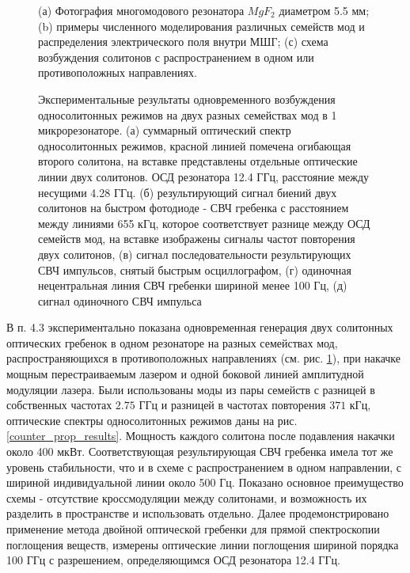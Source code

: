 \begin{figure}[!htb]
\begin{minipage}{1\linewidth}
\end{minipage}
\caption{(а) Фотография многомодового резонатора $MgF_2$ диаметром 5.5 мм; (b) примеры численного моделирования различных семейств мод и распределения электрического поля внутри МШГ; (с) схема возбуждения солитонов с распространением в одном или противоположных направлениях.}
\label{Figure1_V1_c}
\end{figure}

\begin{figure}[!htb]
\begin{minipage}{1\linewidth}
\end{minipage}
\caption{Экспериментальные результаты одновременного возбуждения односолитонных режимов на двух разных семействах мод в 1 микрорезонаторе. (а) суммарный оптический спектр односолитонных режимов, красной линией помечена огибающая второго солитона, на вставке представлены отдельные оптические линии двух солитонов. ОСД резонатора 12.4 ГГц, расстояние между несущими 4.28 ГГц. (б) результирующий сигнал биений двух солитонов на быстром фотодиоде - СВЧ гребенка с расстоянием между линиями 655 кГц, которое соответствует разнице между ОСД семейств мод, на вставке изображены сигналы частот повторения двух солитонов, (в) сигнал последовательности результирующих СВЧ импульсов, снятый быстрым осциллографом, (г) одиночная нецентральная линия СВЧ гребенки шириной менее 100 Гц, (д) сигнал одиночного СВЧ импульса}
\label{Co_Scheme_results}
\end{figure}

В п. 4.3 экспериментально показана одновременная генерация двух солитонных оптических гребенок в одном резонаторе на разных семействах мод, распространяющихся в противоположных направлениях (см. рис. \ref{Figure1_V1_c}), при накачке мощным перестраиваемым лазером и одной боковой линией амплитудной модуляции лазера. Были использованы моды из пары семейств с разницей в собственных частотах $2.75$ ГГц и разницей в частотах повторения $371$ кГц, оптические спектры односолитонных режимов даны на рис. \ref{counter_prop_results}. Мощность каждого солитона после подавления накачки около 400 мкВт. Соответствующая результирующая СВЧ гребенка имела тот же уровень стабильности, что и в схеме с распространением в одном направлении, с шириной индивидуальной линии около 500 Гц. Показано основное преимущество схемы - отсутствие кроссмодуляции между солитонами, и возможность их разделить в пространстве и использовать отдельно. Далее продемонстрировано применение метода двойной оптической гребенки для прямой спектроскопии поглощения веществ, измерены оптические линии поглощения шириной порядка 100 ГГц с разрешением, определяющимся ОСД резонатора 12.4 ГГц.

